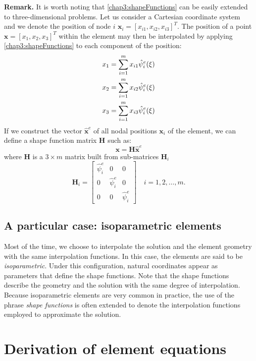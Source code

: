 \noindent \textbf{Remark.}
It is worth noting that \eqref{chap3:shapeFunctions} can be easily extended to three-dimensional problems. Let us consider a Cartesian coordinate system and we denote the position of node $ i $ $ \mathbf{x}_i = [x_{i1}, x_{i2}, x_{i3}]^T$. The position of a point $ \mathbf{x} = [x_{1}, x_{2}, x_{3}]^T$ within the element may then be interpolated by applying \eqref{chap3:shapeFunctions} to each component of the position:
\begin{align}
x_1 &= \sum_{i=1}^m x_{i1} \hat{\psi}_i^e(\xi) \notag \\
x_2 &= \sum_{i=1}^m x_{i2} \hat{\psi}_i^e(\xi) \\
x_3 &= \sum_{i=1}^m x_{i3} \hat{\psi}_i^e(\xi) \notag
\end{align}
If we construct the vector $ \hat{\mathbf{x}}^e $ of all nodal positions $ \mathbf{x}_i $ of the element, we can define a shape function matrix $ \mathbf{H} $ such as:
\begin{equation}
\label{chap3:H}
\mathbf{x} = \mathbf{H} \hat{\mathbf{x}}^e
\end{equation}
where $ \mathbf{H} $ is a $ 3 \times m $ matrix built from sub-matrices $ \mathbf{H}_i $
\begin{equation}
\mathbf{H}_i = 
	\begin{bmatrix}
		\hat{\psi}_i^e & 0 & 0 \\
		0 & \hat{\psi}_i^e & 0 \\
		0 & 0 & \hat{\psi}_i^e
	\end{bmatrix}
\quad i = 1, 2, \ldots, m.
\end{equation}


	\subsection{A particular case: isoparametric elements}
Most of the time, we choose to interpolate the solution and the element geometry with the same interpolation functions. In this case, the elements are said to be \emph{isoparametric}. Under this configuration, natural coordinates appear as parameters that define the shape functions. Note that the shape functions describe the geometry and the solution with the same degree of interpolation. Because isoparametric elements are very common in practice, the use of the phrase \emph{shape functions} is often extended to denote the interpolation functions employed to approximate the solution.
	
	
\section{Derivation of element equations}	\label{chap3:derivationEquations}

